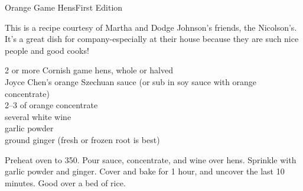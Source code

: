 \begin{entry}{Orange Game Hens}{First Edition}

\begin{open}
  This is a recipe courtesy of Martha and Dodge Johnson's friends, the Nicolson's. It's a great dish for company-especially at their house because they are such nice people and good cooks!
\end{open}
\begin{ingredients}
  2 or more Cornish game hens, whole or halved\\
  Joyce Chen's orange Szechuan sauce (or sub in soy sauce with orange
  concentrate)\\
  \SIrange{2}{3}{\tblspoon} of orange concentrate\\
  several \si{\tblspoon} white wine\\
  garlic powder\\
  ground ginger (fresh or frozen root is best)
\end{ingredients}
Preheat oven to \SI{350}{\degreeF}. Pour sauce, concentrate, and wine over
hens. Sprinkle with garlic powder and ginger. Cover and bake for
1 hour, and uncover the last 10 minutes. Good over a bed of rice.
\end{entry}

